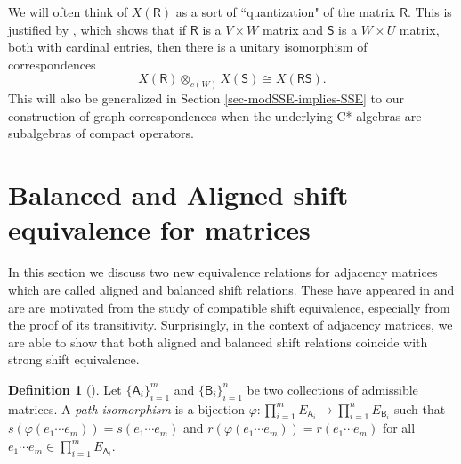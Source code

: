 \documentclass[11pt, letterpaper,final]{amsart}
\theoremstyle{definition}
\newtheorem{dfn}[thm]{Definition}
\begin{document}
We will often think of $X(\mathsf{R})$ as a sort of ``quantization" of the matrix $\mathsf{R}$. This is justified by \cite[Proposition 3.3]{CDE}, which shows that if $\mathsf{R}$ is a $V\times W$ matrix and $\mathsf{S}$ is a $W\times U$ matrix, both with cardinal entries, then there is a unitary isomorphism of correspondences
\[
    X(\mathsf{R})\otimes_{c(W)} X(\mathsf{S})\cong X(\mathsf{R}\mathsf{S}).
\]
This will also be generalized in Section \ref{sec-modSSE-implies-SSE} to our construction of graph correspondences when the underlying C*-algebras are subalgebras of compact operators.

\section{Balanced and Aligned shift equivalence for matrices}\label{sec_eq_CDE}

In this section we discuss two new equivalence relations for adjacency matrices which are called aligned and balanced shift relations. These have appeared in \cite{CDE} and are are motivated from the study of compatible shift equivalence, especially from the proof of its transitivity. Surprisingly, in the context of adjacency matrices, we are able to show that both aligned and balanced shift relations coincide with strong shift equivalence.

\begin{dfn}[{\cite[Definition~1.2]{CDE}}]\label{dfn-path-iso}
Let $\{ \mathsf{A}_i \}_{i=1}^m$ and $\{ \mathsf{B}_i \}_{i=1}^n$ be two collections of admissible matrices.  A \emph{path isomorphism} is a bijection $\varphi \colon\prod_{i=1}^m E_{\mathsf{A}_i} \to \prod_{i=1}^n E_{\mathsf{B}_i}$ such that $s( \varphi(e_1 \cdots e_m)) = s(e_1 \cdots e_m)$ and $r( \varphi(e_1 \cdots e_m))=r(e_1 \cdots e_m)$ for all $e_1 \cdots e_m \in \prod_{i=1}^m E_{\mathsf{A}_i}$.
\end{dfn}
\end{document}
